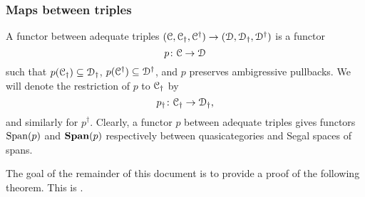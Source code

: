 \documentclass[main.tex]{subfiles}
\begin{document}
\subsubsection*{Maps between triples}

A functor between adequate triples $(\mathcal{C}, \mathcal{C}_{\dagger}, \mathcal{C}^{\dagger}) \to (\mathcal{D}, \mathcal{D}_{\dagger}, \mathcal{D}^{\dagger})$ is a functor
\begin{equation*}
  p\colon \mathcal{C} \to \mathcal{D}
\end{equation*}
such that $p(\mathcal{C}_{\dagger}) \subseteq \mathcal{D}_{\dagger}$, $p(\mathcal{C}^{\dagger}) \subseteq \mathcal{D}^{\dagger}$, and $p$ preserves ambigressive pullbacks. We will denote the restriction of $p$ to $\mathcal{C}_{\dagger}$ by
\begin{equation*}
  p_{\dagger}\colon\mathcal{C}_{\dagger} \to \mathcal{D}_{\dagger},
\end{equation*}
and similarly for $p^{\dagger}$. Clearly, a functor $p$ between adequate triples gives functors $\mathrm{Span}(p)$ and $\mathbf{Span}(p)$ respectively between quasicategories and Segal spaces of spans.

The goal of the remainder of this document is to provide a proof of the following theorem. This is \cite[Thm.\ 12.2]{spectralmackeyfunctors1}.
\end{document}
